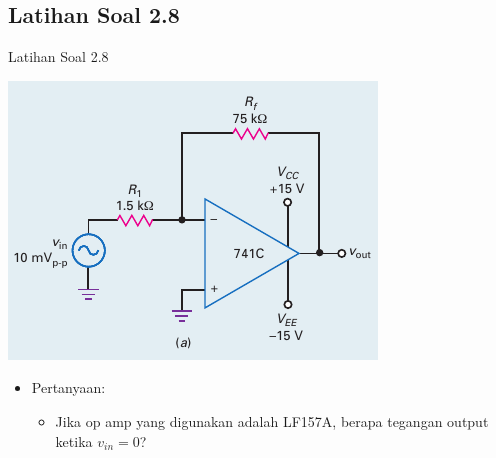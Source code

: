 \subsection{Latihan Soal 2.8}
\begin{frame}{Latihan Soal 2.8}
	\begin{multicols}{2}
		\begin{center}
			\includegraphics[width=\linewidth]{gambar/fig-16.17a}
		\end{center}
		\columnbreak
		\begin{itemize}
			\item Pertanyaan:
			\begin{itemize}
				\item Jika op amp yang digunakan adalah LF157A, berapa tegangan output ketika $ v_{in} = 0 $?
			\end{itemize}
		\end{itemize}
	\end{multicols}
\end{frame}

